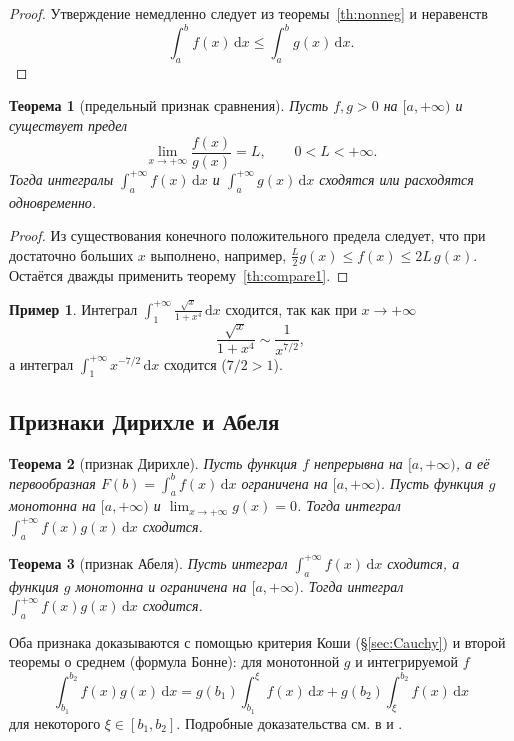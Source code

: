 \documentclass[12pt,a4paper]{article}
\newtheorem{theorem}{Теорема}[section]
\theoremstyle{definition}
\newtheorem{example}{Пример}[section]
\newcommand{\dd}{\,\mathrm{d}}
\begin{document}
\begin{proof}
Утверждение немедленно следует из теоремы~\ref{th:nonneg} и неравенств
\[
\int_a^b f(x)\dd x\le\int_a^b g(x)\dd x.
\]
\end{proof}

\begin{theorem}[предельный признак сравнения]\label{th:compare2}
Пусть $f,g>0$ на $[a,+\infty)$ и существует предел
\[
\lim_{x\to+\infty}\frac{f(x)}{g(x)}=L,\qquad 0<L<+\infty.
\]
Тогда интегралы $\int_a^{+\infty}f(x)\dd x$ и $\int_a^{+\infty}g(x)\dd x$ сходятся или расходятся одновременно.
\end{theorem}

\begin{proof}
Из существования конечного положительного предела следует, что при достаточно больших $x$ выполнено, например, $\frac{L}{2}g(x)\le f(x)\le 2L\,g(x)$. Остаётся дважды применить теорему~\ref{th:compare1}.
\end{proof}

\begin{example}
Интеграл $\displaystyle\int_1^{+\infty}\frac{\sqrt{x}}{1+x^4}\dd x$ сходится, так как при $x\to+\infty$
\[
\frac{\sqrt{x}}{1+x^4}\sim\frac{1}{x^{7/2}},
\]
а интеграл $\int_1^{+\infty}x^{-7/2}\dd x$ сходится ($7/2>1$).
\end{example}

\subsection{Признаки Дирихле и Абеля}

\begin{theorem}[признак Дирихле]\label{th:Dirichlet}
Пусть функция $f$ непрерывна на $[a,+\infty)$, а её первообразная $F(b)=\int_a^b f(x)\dd x$ ограничена на $[a,+\infty)$. Пусть функция $g$ монотонна на $[a,+\infty)$ и $\lim_{x\to+\infty}g(x)=0$. Тогда интеграл $\int_a^{+\infty}f(x)g(x)\dd x$ сходится.
\end{theorem}

\begin{theorem}[признак Абеля]\label{th:Abel}
Пусть интеграл $\int_a^{+\infty}f(x)\dd x$ сходится, а функция $g$ монотонна и ограничена на $[a,+\infty)$. Тогда интеграл $\int_a^{+\infty}f(x)g(x)\dd x$ сходится.
\end{theorem}

Оба признака доказываются с помощью критерия Коши (\S\ref{sec:Cauchy}) и второй теоремы о среднем (формула Бонне): для монотонной $g$ и интегрируемой $f$
\[
\int_{b_1}^{b_2}f(x)g(x)\dd x = g(b_1)\int_{b_1}^{\xi}f(x)\dd x + g(b_2)\int_{\xi}^{b_2}f(x)\dd x
\]
для некоторого $\xi\in[b_1,b_2]$. Подробные доказательства см. в \cite[гл.~XIII,~\S1]{Ficht} и \cite[гл.~XVII,~\S2]{Zorich2}.
\end{document}
